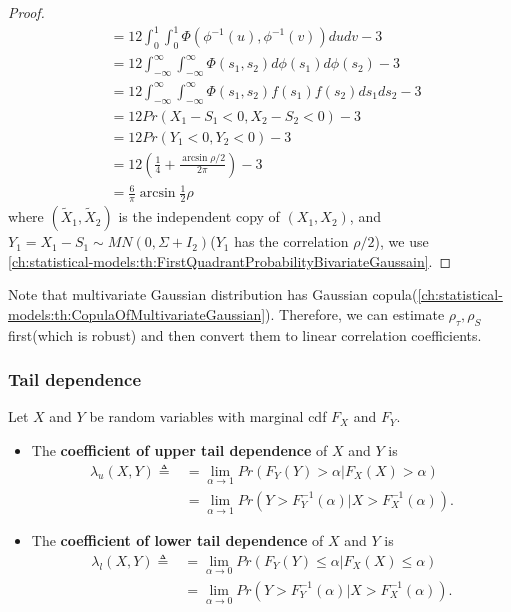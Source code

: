 \begin{refsection}
\begin{proof}
\begin{align*}
&=12\int_0^1\int_0^1 \Phi(\phi^{-1}(u),\phi^{-1}(v))dudv - 3 \\
&=12\int_{-\infty}^{\infty}\int_{-\infty}^{\infty} \Phi(s_1,s_2)d\phi(s_1)d\phi(s_2) - 3 \\
&=12\int_{-\infty}^{\infty}\int_{-\infty}^{\infty} \Phi(s_1,s_2) f(s_1)f(s_2)ds_1ds_2 - 3 \\
&=12 Pr(X_1-S_1<0, X_2-S_2<0) -3 \\
&=12 Pr(Y_1<0,Y_2<0) -3 \\
&=12(\frac{1}{4}+ \frac{\arcsin \rho/2}{2\pi}) - 3\\
&=\frac{6}{\pi}\arcsin \frac{1}{2}\rho
\end{align*}
where $(\tilde{X}_1,\tilde{X}_2)$ is the independent copy of $(X_1,X_2)$, and $Y_1 = X_1-S_1\sim MN(0,\Sigma + I_2)$($Y_1$ has the correlation $\rho/2$), we use \autoref{ch:statistical-models:th:FirstQuadrantProbabilityBivariateGaussain}.
\end{proof}


\begin{remark}
Note that multivariate Gaussian distribution has Gaussian copula(\autoref{ch:statistical-models:th:CopulaOfMultivariateGaussian}). Therefore, we can estimate $\rho_\tau, \rho_S$ first(which is robust) and then convert them to linear correlation coefficients.	
\end{remark}



\subsubsection{Tail dependence}

\begin{definition}
Let $X$ and $Y$ be random variables with marginal cdf $F_X$ and $F_Y$.
\begin{itemize}
	\item The \textbf{coefficient	of upper tail dependence} of $X$ and $Y$ is
	\begin{align*}
	\lambda_u(X,Y) \triangleq &= \lim_{\alpha\to 1} Pr(F_Y(Y) > \alpha | F_X(X) > \alpha) \\
	&= \lim_{\alpha\to 1} Pr(Y > F^{-1}_Y(\alpha)|X > F^{-1}_X(\alpha)).
	\end{align*}
	\item The \textbf{coefficient	of lower tail dependence} of $X$ and $Y$ is
	\begin{align*}
	\lambda_l(X,Y) \triangleq &= \lim_{\alpha\to 0} Pr(F_Y(Y) \leq \alpha | F_X(X) \leq \alpha) \\
	&= \lim_{\alpha\to 0} Pr(Y > F^{-1}_Y(\alpha)|X > F^{-1}_X(\alpha)).
	\end{align*}
\end{itemize}
 


\end{definition}
\end{refsection}
